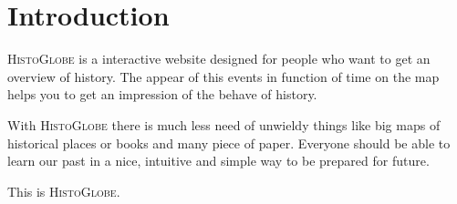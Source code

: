 \section{Introduction}

\textsc{HistoGlobe} is a interactive website designed for people who want to get an overview of history. The appear of this events in function of time on the map helps you to get an impression of the behave of history.



With \textsc{HistoGlobe} there is much less need of unwieldy things like big maps of historical places or books and many piece of paper. Everyone should be able to learn our past in a nice, intuitive and simple way to be prepared for future.

This is \textsc{HistoGlobe}.
